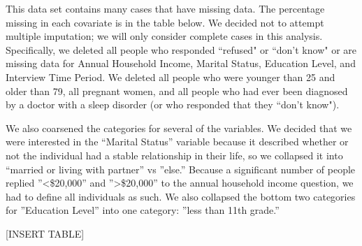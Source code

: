 \documentclass{article}
\begin{document}
This data set contains many cases that have missing data.  The percentage missing in each covariate is in the table below.  We decided not to attempt multiple imputation; we will only consider complete cases in this analysis.  Specifically, we deleted all people who responded ``refused" or ``don't know" or are missing data for Annual Household Income, Marital Status, Education Level, and Interview Time Period.  We deleted all people who were younger than 25 and older than 79, all pregnant women, and all people who had ever been diagnosed by a doctor with a sleep disorder (or who responded that they ``don't know").  

We also coarsened the categories for several of the variables.  We decided that we were interested in the ``Marital Status'' variable because it described whether or not the individual had a stable relationship in their life, so we collapsed it into ``married or living with partner'' vs ''else.''  Because a significant number of people replied ''<\$20,000'' and ''>\$20,000'' to the annual household income question, we had to define all individuals as such.  We also collapsed the bottom two categories for ''Education Level'' into one category: ''less than 11th grade.''

[INSERT TABLE]


% 
% 
\end{document}
